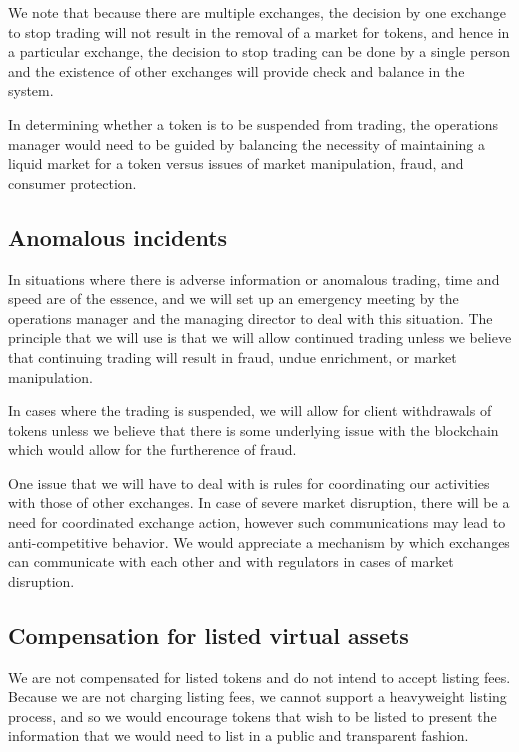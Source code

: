 We note that because there are multiple exchanges, the decision by one
exchange to stop trading will not result in the removal of a market
for tokens, and hence in a particular exchange, the decision to stop
trading can be done by a single person and the existence of other
exchanges will provide check and balance in the system.

In determining whether a token is to be suspended from trading, the
operations manager would need to be guided by balancing the necessity
of maintaining a liquid market for a token versus issues of market
manipulation, fraud, and consumer protection.


\subsection{Anomalous incidents}
In situations where there is adverse information or anomalous trading,
time and speed are of the essence, and we will set up an emergency
meeting by the operations manager and the managing director to deal
with this situation.  The principle that we will use is that we will
allow continued trading unless we believe that continuing trading will
result in fraud, undue enrichment, or market manipulation.

In cases where the trading is suspended, we will allow for client
withdrawals of tokens unless we believe that there is some underlying
issue with the blockchain which would allow for the furtherence of
fraud.

One issue that we will have to deal with is rules for coordinating our
activities with those of other exchanges.  In case of severe market
disruption, there will be a need for coordinated exchange action,
however such communications may lead to anti-competitive behavior.  We
would appreciate a mechanism by which exchanges can communicate with
each other and with regulators in cases of market disruption.

\subsection{Compensation for listed virtual assets}

We are not compensated for listed tokens and do not intend to accept
listing fees.  Because we are not charging listing fees, we cannot
support a heavyweight listing process, and so we would encourage
tokens that wish to be listed to present the information that we would
need to list in a public and transparent fashion.

